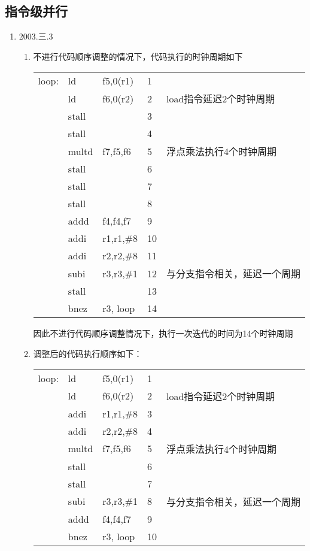 \documentclass[a4paper]{ctexart}
\begin{document}
\subsection{指令级并行}
\begin{enumerate}
  \item 2003.三.3
  \begin{enumerate}
    \item 不进行代码顺序调整的情况下，代码执行的时钟周期如下
    \begin{table}[!htbp]
      \centering
      \begin{tabular}{lllll}
        loop: & ld & f5,0(r1)&1 \\
        & ld & f6,0(r2)&2 &load指令延迟2个时钟周期\\
        & stall&&3 \\
        & stall&&4\\
        & multd & f7,f5,f6 &5&浮点乘法执行4个时钟周期\\
        & stall&&6 \\
        & stall&&7\\
        & stall&&8\\
        & addd & f4,f4,f7&9\\
        & addi & r1,r1,\#8&10\\
        & addi & r2,r2,\#8&11\\
        & subi & r3,r3,\#1&12&与分支指令相关，延迟一个周期\\
        & stall&&13 \\
        & bnez & r3, loop&14
      \end{tabular}
    \end{table}
    因此不进行代码顺序调整情况下，执行一次迭代的时间为14个时钟周期
    \item 调整后的代码执行顺序如下：
    \begin{table}[!htbp]
      \centering
      \begin{tabular}{lllll}
        loop: & ld & f5,0(r1)&1 \\
        & ld & f6,0(r2)&2 &load指令延迟2个时钟周期\\
        & addi & r1,r1,\#8&3\\
        & addi & r2,r2,\#8&4\\
        & multd & f7,f5,f6 &5&浮点乘法执行4个时钟周期\\
        & stall&&6 \\
        & stall&&7\\
        & subi & r3,r3,\#1&8&与分支指令相关，延迟一个周期\\
        & addd & f4,f4,f7&9\\
        & bnez & r3, loop&10
      \end{tabular}
    \end{table}
  \end{enumerate}
\end{enumerate}
\end{document}
